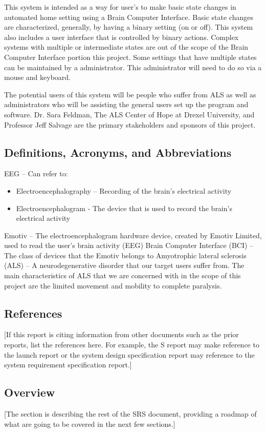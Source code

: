 \documentclass{report}
\begin{document}
This system is intended as a way for user's to make basic state changes in automated home setting
using a Brain Computer Interface. Basic state changes are characterized, generally, by having a binary 
setting (on or off). This system also includes a user interface that is controlled by binary actions. Complex 
systems with multiple or intermediate states are out of the scope of the Brain Computer Interface portion 
this project. Some settings that have multiple states can be maintained by a administrator. This 
administrator will need to do so via a mouse and keyboard. 

The potential users of this system will be people who suffer from ALS as well as administrators 
who will be assisting the general users set up the program and software. Dr. Sara Feldman, The ALS 
Center of Hope at Drexel University, and Professor Jeff Salvage are the primary stakeholders and 
sponsors of this project.

\subsection{Definitions, Acronyms, and Abbreviations}
EEG – Can refer to:
\begin{itemize}
	\item Electroencephalography – Recording of the brain's electrical activity 
	\item Electroencephalogram - The device that is used to record the brain's electrical activity
\end{itemize}
Emotiv – The electroencephalogram hardware device, created by Emotiv Limited, used to read the user's 
brain activity (EEG)
Brain Computer Interface (BCI) – The class of devices that the Emotiv belongs to
Amyotrophic lateral sclerosis (ALS) – A neurodegenerative disorder that our target users suffer from. 
The main characteristics of ALS that we are concerned with in the scope of this project are the limited 
movement and mobility to complete paralysis.

\subsection{References}
[If this report is citing information from other documents such as the prior reports, list the references here. 
For example, the S report may make reference to the launch report or the system design specification 
report may reference to the system requirement specification report.]

\subsection{Overview}
[The section is describing the rest of the SRS document, providing a roadmap of what are going to be 
covered in the next few sections.]
\end{document}
